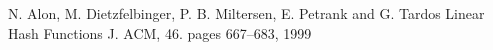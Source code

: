 \documentclass{article}
\begin{document}
\begin{thebibliography}{32}
N. Alon, M. Dietzfelbinger, P. B. Miltersen, E. Petrank and G. Tardos
\newblock Linear Hash Functions
\newblock J. {ACM}, 46. pages 667--683, 1999





\end{thebibliography}
\end{document}
